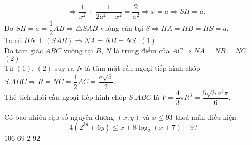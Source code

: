 \begin{ex}
{$$\begin{aligned}
	& \Rightarrow \dfrac{1}{x^2}+\dfrac{1}{2 a^2-x^2}=\dfrac{2}{a^2}\Rightarrow x=a \Rightarrow S H=a.
\end{aligned}
$$
Do $SH=a=\dfrac{1}{2}AB \Rightarrow \triangle SAB$ vuông cân tại $S \Rightarrow HA=HB=HS=a$.\\
Ta có $HN \perp(SAB) \Rightarrow NA=NB=NS$. \hfill $(1)$\\
Do tam giác $ABC$ vuông tại $B$, $N$ là trung điểm của $AC \Rightarrow NA=NB=NC$. \hfill $(2)$\\
Từ $(1)$, $(2)$ suy ra $ N$ là tâm mặt cầu ngoại tiếp hình chóp $S.ABC \Rightarrow R=NC=\dfrac{1}{2}AC=\dfrac{a \sqrt{5}}{2}$.\\
Thể tích khối cầu ngoại tiếp hình chóp $S.ABC$ là $V=\dfrac{4}{3}\pi R^3=\dfrac{5 \sqrt{5}a^3 \pi}{6}$.	
}
\end{ex}

\begin{ex}%
	Có bao nhiêu cặp số nguyên dương $(x; y)$ và $x \leq 93$ thoả mãn điều kiện $$4\left(2^{3y}+6 y\right) \leq x+8 \log _2(x+7)-9?$$
	\choice
	{$106$}
	{\True $69$}
	{$2$}
	{$92$}
\end{ex}

